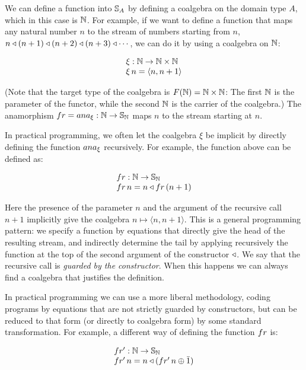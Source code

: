 We can define a function into $\mathbb{S}_{A}$ by defining a coalgebra on the domain type $A$, which in this case is $\mathbb{N}$.
For example, if we want to define a function that maps any natural number $n$ to the stream of numbers starting from $n$, $n\triangleleft (n+1) \triangleleft (n+2) \triangleleft (n+3) \triangleleft \cdots$, we can do it by using a coalgebra on $\mathbb{N}$:

$$
\begin{array}{l}
\xi : \mathbb{N} \rightarrow \mathbb{N}\times \mathbb{N}\\
\xi\,n = \langle n,n+1\rangle
\end{array}
$$

(Note that the target type of the coalgebra is $F(\mathbb{N}) = \mathbb{N}\times\mathbb{N}$: The first $\mathbb{N}$ is the parameter of the functor, while the second $\mathbb{N}$ is the carrier of the coalgebra.)
The anamorphism $\sfr = \ana{\xi}:\nat \rightarrow \stream{\nat}$ maps $n$ to the stream starting at $n$.

In practical programming, we often let the coalgebra $\xi$ be implicit by directly defining the function $\ana{\xi}$ recursively.
For example, the function above can be defined as:

$$
\begin{array}{l}
\sfr: \nat \rightarrow \stream{\nat}\\
\sfr\,n = n \scons \sfr\,(n+1)
\end{array}
$$

Here the presence of the parameter $n$ and the argument of the recursive call $n+1$ implicitly give the coalgebra $n \mapsto \langle n, n+1\rangle$.
This is a general programming pattern: we specify a function by equations that directly give the head of the resulting stream, and indirectly determine the tail
 by applying recursively the function at the top of the second argument of the constructor ${\triangleleft}$.
We say that the recursive call is {\em guarded by the constructor}.
When this happens we can always find a coalgebra that justifies the definition.

In practical programming we can use a more liberal methodology, coding programs by equations that are not strictly guarded by constructors, but can be reduced to that form (or directly to coalgebra form) by some standard transformation.
For example, a different way of defining the function $\sfr$ is:

$$
\begin{array}{l}
\sfp: \nat \rightarrow \stream{\nat}\\
\sfp\,n = n \scons (\sfp\,n \oplus \bar{1})
\end{array}
$$

